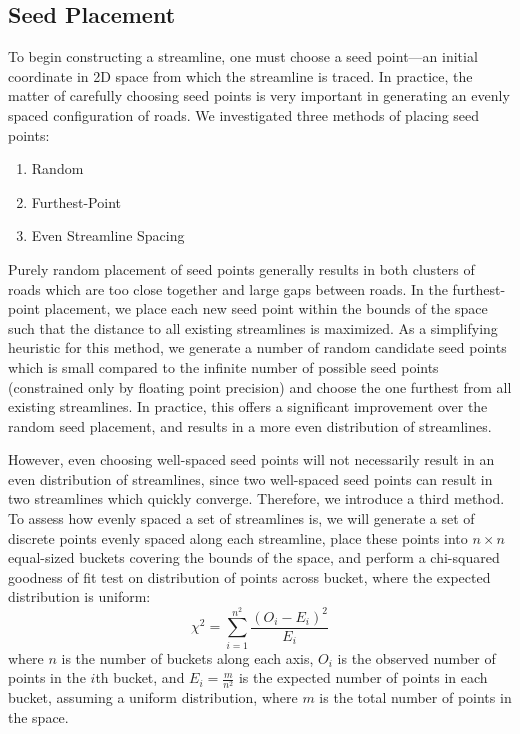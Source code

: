 \documentclass[twocolumn]{article}
\newcommand{\todo}[1]{\begin{center}\fbox{\parbox{150pt}{#1}}\end{center}}
\begin{document}
\todo{death spiral and improved version}

\subsection{Seed Placement}
To begin constructing a streamline, one must choose a seed point—an initial
coordinate in 2D space from which the streamline is traced. In practice, the
matter of carefully choosing seed points is very important in generating an
evenly spaced configuration of roads. We investigated three methods of placing
seed points:
\begin{enumerate}
    \item Random
    \item Furthest-Point
    \item Even Streamline Spacing
\end{enumerate}
Purely random placement of seed points generally results in both clusters of
roads which are too close together and large gaps between roads. In the
furthest-point placement, we place each new seed point within the bounds of the
space such that the distance to all existing streamlines is maximized. As a
simplifying heuristic for this method, we generate a number of random candidate
seed points which is small compared to the infinite number of possible seed
points (constrained only by floating point precision) and choose the one
furthest from all existing streamlines. In practice, this offers a significant
improvement over the random seed placement, and results in a more even
distribution of streamlines.

However, even choosing well-spaced seed points will not necessarily result in
an even distribution of streamlines, since two well-spaced seed points can
result in two streamlines which quickly converge. Therefore, we introduce a
third method. To assess how evenly spaced a set of streamlines is, we will
generate a set of discrete points evenly spaced along each streamline, place
these points into $n\times n$ equal-sized buckets covering the bounds of the
space, and perform a chi-squared goodness of fit test on distribution of points
across bucket, where the expected distribution is uniform:
\[
    \chi^2 = \sum_{i=1}^{n^2} \frac{(O_i-E_i)^2}{E_i}
\]
where $n$ is the number of buckets along each axis, $O_i$ is the observed
number of points in the $i$th bucket, and $E_i=\frac{m}{n^2}$ is the
expected number of points in each bucket, assuming a uniform distribution,
where $m$ is the total number of points in the space.
\end{document}
